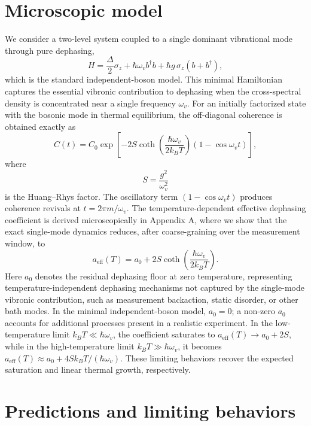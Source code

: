\documentclass[aps,prl,twocolumn,showpacs,superscriptaddress,groupedaddress]{revtex4-2}
\begin{document}
\section{Microscopic model}

We consider a two-level system coupled to a single dominant vibrational mode through pure dephasing,
\[
H=\frac{\Delta}{2}\sigma_z+\hbar\omega_v b^\dagger b+\hbar g\,\sigma_z(b+b^\dagger),
\]
which is the standard independent-boson model. This minimal Hamiltonian captures the essential vibronic contribution to dephasing when the cross-spectral density is concentrated near a single frequency \(\omega_v\). For an initially factorized state with the bosonic mode in thermal equilibrium, the off-diagonal coherence is obtained exactly as
\[
C(t)=C_0\exp\!\left[-2S\coth\!\left(\frac{\hbar\omega_v}{2k_B T}\right)(1-\cos\omega_v t)\right],
\]
where
\[
S=\frac{g^2}{\omega_v^2}
\]
is the Huang–Rhys factor. The oscillatory term \((1-\cos\omega_v t)\) produces coherence revivals at \(t=2\pi m/\omega_v\). The temperature-dependent effective dephasing coefficient is derived microscopically in Appendix A, where we show that the exact single-mode dynamics reduces, after coarse-graining over the measurement window, to
\[
a_{\mathrm{eff}}(T)=a_0+2S\coth\!\left(\frac{\hbar\omega_v}{2k_B T}\right).
\]
Here \(a_0\) denotes the residual dephasing floor at zero temperature, representing temperature-independent dephasing mechanisms not captured by the single-mode vibronic contribution, such as measurement backaction, static disorder, or other bath modes. In the minimal independent-boson model, \(a_0=0\); a non-zero \(a_0\) accounts for additional processes present in a realistic experiment. In the low-temperature limit \(k_B T\ll \hbar\omega_v\), the coefficient saturates to \(a_{\mathrm{eff}}(T)\to a_0+2S\), while in the high-temperature limit \(k_B T\gg \hbar\omega_v\), it becomes \(a_{\mathrm{eff}}(T)\approx a_0+4Sk_B T/(\hbar\omega_v)\). These limiting behaviors recover the expected saturation and linear thermal growth, respectively.

\section{Predictions and limiting behaviors}
\end{document}
